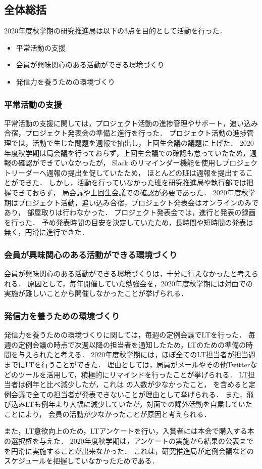 \subsection*{全体総括}


2020年度秋学期の研究推進局は以下の3点を目的として活動を行った．
\begin{itemize}
\item 平常活動の支援
\item 会員が興味関心のある活動ができる環境づくり
\item 発信力を養うための環境づくり
\end{itemize}

\subsubsection*{平常活動の支援}
平常活動の支援に関しては，プロジェクト活動の進捗管理やサポート，追い込み合宿，プロジェクト発表会の準備と進行を行った．
プロジェクト活動の進捗管理では，活動で生じた問題を週報で抽出し，上回生会議の議題に上げた．
2020年度秋学期は局会議を行っておらず，上回生会議での確認も怠っていたため，週報の確認ができていなかったが，
Slack のリマインダー機能を使用しプロジェクトリーダーへ週報の提出を促していたため，
ほとんどの班は週報を提出することができた．
しかし，活動を行っていなかった班を研究推進局や執行部では把握できておらず，
局会議や上回生会議での確認が必要であった．
2020年度秋学期はプロジェクト活動，追い込み合宿，プロジェクト発表会はオンラインのみであり，
部屋取りは行わなかった．
プロジェクト発表会では，進行と発表の録画を行った．
予め発表時間の目安を決定していたため，長時間や短時間の発表は無く，円滑に進行できた．

\subsubsection*{会員が興味関心のある活動ができる環境づくり}
会員が興味関心のある活動ができる環境づくりは，十分に行えなかったと考えられる．
原因として，毎年開催していた勉強会を，2020年度秋学期には対面での実施が難しいことから開催しなかったことが挙げられる．

\subsubsection*{発信力を養うための環境づくり}
発信力を養うための環境づくりに関しては，毎週の定例会議でLTを行った．
毎週の定例会議の時点で次週以降の担当者を通知したため，LTのための準備の時間を与えられたと考える．
2020年度秋学期には，ほぼ全てのLT担当者が担当週までにLTを行うことができた．
理由としては，局員がメールやその他Twitterなどのツールを活用して，積極的にリマインドを行ったことが挙げられる．
LT担当者は例年と比べ減少したが，これは \firstGrade の人数が少なかったこと，
\secondGrade を含めると定例会議で全ての担当者が発表できないことが理由として挙げられる．
また，飛び込みLTも例年より大幅に減少していたが，対面での課外活動を自粛していたことにより，
会員の活動が少なかったことが原因と考えられる．

また，LT意欲向上のため，LTアンケートを行い，入賞者には本会で購入する本の選択権を与えた．
2020年度秋学期は，アンケートの実施から結果の公表までを円滑に実施することが出来なかった．
これは，研究推進局が定例会議などのスケジュールを把握していなかったためである．
